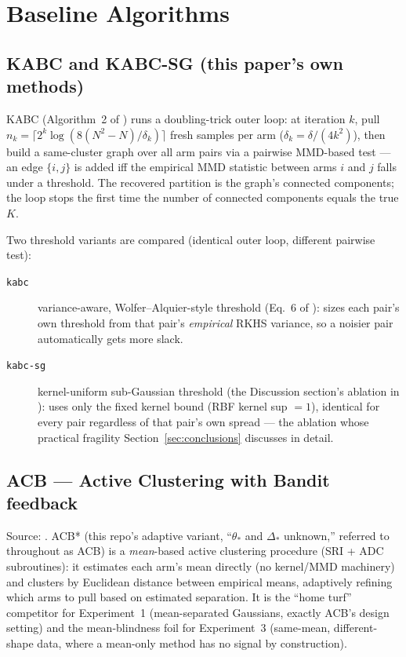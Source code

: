\documentclass[11pt]{article}
\begin{document}
\FloatBarrier
\section{Baseline Algorithms}
\label{sec:baselines}

\subsection{KABC and KABC-SG (this paper's own methods)}

KABC (Algorithm~2 of \cite{kabc2026}) runs a doubling-trick outer loop: at
iteration $k$, pull $n_k = \lceil 2^k \log(8(N^2-N)/\delta_k)\rceil$ fresh samples
per arm ($\delta_k = \delta/(4k^2)$), then build a same-cluster graph over all arm
pairs via a pairwise MMD-based test --- an edge $\{i,j\}$ is added iff the
empirical MMD statistic between arms $i$ and $j$ falls under a threshold. The
recovered partition is the graph's connected components; the loop stops the
first time the number of connected components equals the true $K$.

Two threshold variants are compared (identical outer loop, different pairwise
test):
\begin{description}
  \item[\texttt{kabc}] variance-aware, Wolfer--Alquier-style threshold (Eq.~6 of
    \cite{kabc2026}): sizes each pair's own threshold from that pair's
    \emph{empirical} RKHS variance, so a noisier pair automatically gets more
    slack.
  \item[\texttt{kabc-sg}] kernel-uniform sub-Gaussian threshold (the Discussion
    section's ablation in \cite{kabc2026}): uses only the fixed kernel bound
    (RBF kernel sup $=1$), identical for every pair regardless of that pair's
    own spread --- the ablation whose practical fragility Section~\ref{sec:conclusions}
    discusses in detail.
\end{description}

\subsection{ACB --- Active Clustering with Bandit feedback}

Source: \cite{acb2024}. ACB* (this repo's adaptive variant, ``$\theta_*$ and
$\Delta_*$ unknown,'' referred to throughout as ACB) is a \emph{mean}-based active
clustering procedure (SRI + ADC subroutines): it estimates each arm's mean
directly (no kernel/MMD machinery) and clusters by Euclidean distance between
empirical means, adaptively refining which arms to pull based on estimated
separation. It is the ``home turf'' competitor for Experiment~1 (mean-separated
Gaussians, exactly ACB's design setting) and the mean-blindness foil for
Experiment~3 (same-mean, different-shape data, where a mean-only method has no
signal by construction).
\end{document}
